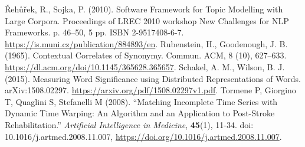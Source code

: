 \documentclass[11pt,french,french]{article}
\begin{document}
\begin{thebibliography}{999}
 {\v R}eh{\r u}{\v r}ek, R.,  Sojka, P. (2010). Software Framework for Topic Modelling with Large Corpora. Proceedings of LREC 2010 workshop New Challenges for NLP Frameworks. p. 46--50, 5 pp. ISBN 2-9517408-6-7. \url{https://is.muni.cz/publication/884893/en}.
 Rubenstein, H.,  Goodenough, J. B. (1965). Contextual Correlates of Synonymy. Commun. ACM, 8 (10), 627–633. \url{https://dl.acm.org/doi/10.1145/365628.365657}.
 Schakel, A. M., Wilson, B. J. (2015). Measuring Word Significance using Distributed Representations of Words. arXiv:1508.02297. \url{https://arxiv.org/pdf/1508.02297v1.pdf}.
 Tormene P, Giorgino T, Quaglini S, Stefanelli M (2008). “Matching
Incomplete Time Series with Dynamic Time Warping: An Algorithm and an
Application to Post-Stroke Rehabilitation.” \emph{Artificial Intelligence
in Medicine}, \textbf{45}(1), 11-34. doi: 10.1016/j.artmed.2008.11.007, \url{https://doi.org/10.1016/j.artmed.2008.11.007}.
\end{thebibliography}
\end{document}

